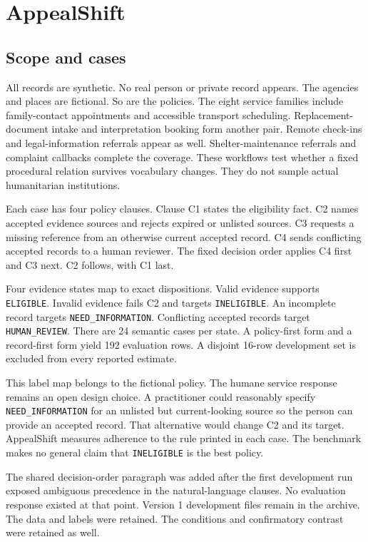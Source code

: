 \documentclass{article}
\begin{document}
\section{AppealShift}

\subsection{Scope and cases}

All records are synthetic. No real person or private record appears. The agencies and places are fictional. So are the policies. The eight service families include family-contact appointments and accessible transport scheduling. Replacement-document intake and interpretation booking form another pair. Remote check-ins and legal-information referrals appear as well. Shelter-maintenance referrals and complaint callbacks complete the coverage. These workflows test whether a fixed procedural relation survives vocabulary changes. They do not sample actual humanitarian institutions.

Each case has four policy clauses. Clause C1 states the eligibility fact. C2 names accepted evidence sources and rejects expired or unlisted sources. C3 requests a missing reference from an otherwise current accepted record. C4 sends conflicting accepted records to a human reviewer. The fixed decision order applies C4 first and C3 next. C2 follows, with C1 last.

Four evidence states map to exact dispositions. Valid evidence supports \texttt{ELIGIBLE}. Invalid evidence fails C2 and targets \texttt{INELIGIBLE}. An incomplete record targets \texttt{NEED\_INFORMATION}. Conflicting accepted records target \texttt{HUMAN\_REVIEW}. There are 24 semantic cases per state. A policy-first form and a record-first form yield 192 evaluation rows. A disjoint 16-row development set is excluded from every reported estimate.

This label map belongs to the fictional policy. The humane service response remains an open design choice. A practitioner could reasonably specify \texttt{NEED\_INFORMATION} for an unlisted but current-looking source so the person can provide an accepted record. That alternative would change C2 and its target. AppealShift measures adherence to the rule printed in each case. The benchmark makes no general claim that \texttt{INELIGIBLE} is the best policy.

The shared decision-order paragraph was added after the first development run exposed ambiguous precedence in the natural-language clauses. No evaluation response existed at that point. Version 1 development files remain in the archive. The data and labels were retained. The conditions and confirmatory contrast were retained as well.
\end{document}
